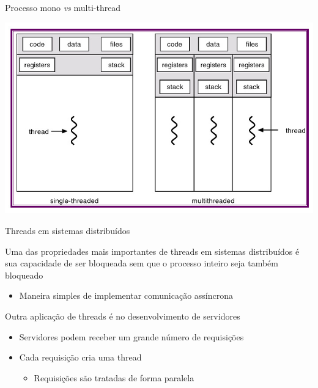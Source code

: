 \documentclass[compress]{beamer}
\begin{document}

\begin{frame}{Processo mono \textit{vs}  multi-thread}

\vspace{1cm}

\centering \includegraphics[width=\textwidth]{images/multi-thread.png}
\end{frame}


\begin{frame}{Threads em sistemas distribuídos}

Uma das propriedades mais importantes de threads em sistemas distribuídos é sua capacidade de ser bloqueada sem que o processo inteiro seja também bloqueado
\begin{itemize}
    \item Maneira simples de implementar comunicação assíncrona
\end{itemize}

\vspace{0.5cm}

Outra aplicação de threads é no desenvolvimento de servidores
\begin{itemize}
    \item Servidores podem receber um grande número de requisições
    \item Cada requisição cria uma thread
    \begin{itemize}
        \item Requisições são tratadas de forma paralela
    \end{itemize}
\end{itemize}
\end{frame}
\end{document}
